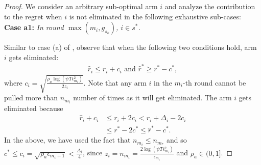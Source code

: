 \begin{proof}
We consider an arbitrary sub-optimal arm ${i}$ and analyze the contribution to the regret when $i$ is not eliminated in the following exhaustive sub-cases:\\
\textbf{Case a1:} \textit{In round $\max(m_{i},g_{s_{k}})$, ${i} \in s^{*}$.}

Similar to case (a) of \citet{auer2010ucb}, observe that when the following two conditions hold, arm $i$ gets eliminated:
\begin{align}
\hat{r}_{i}  \le r_{i} + c_{i} \text{ and } 
 \hat{r}^{*}\geq  r^{*} - c^{*}, \label{eq:armelim-casea1}
\end{align}
where  $c_i = \sqrt{\frac{\rho_{a}\log (\psi T\epsilon_{m_{i}}^{2})}{2 z_{i}}}$. Note that any arm $i$ in the $m_{i}$-th round cannot be pulled more than $n_{m_{i}}$ number of times as it will get eliminated. The arm $i$ gets eliminated because 
  \begin{align*}
\hat{r}_{i} +c_i & \leq r_{i} + 2c_{i} < r_{i} + \Delta_{i} - 2c_{i}\\
 &\leq r^{*} -2c^{*} \leq \hat{r}^{*} - c^{*}  .
  \end{align*}
In the above, we have used the fact that $n_{m_i} \leq n_{m_*}$ and so \\ $c^{*} \leq c_i = \sqrt{\rho_{a}\epsilon_{m_{i}+1}} < \frac{\Delta_{i}}{4}$, since $z_i = n_{m_{i}}=\frac{2\log{(\psi T\epsilon_{m_{i}}^{2})}}{\epsilon_{m_{i}}}$ and $\rho_{a}\in (0,1]$.


\end{proof}
